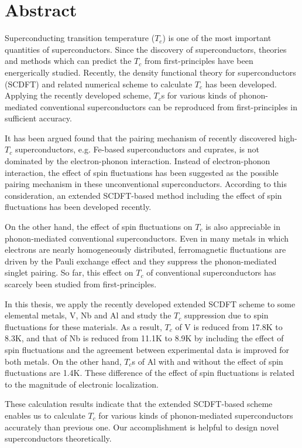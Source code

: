 


\chapter*{Abstract}

Superconducting transition temperature ($T_{c}$) is one of the most important quantities of superconductors. 
Since the discovery of superconductors, theories and methods which can predict the $T_c$ from
first-principles have been energerically studied. Recently, the density functional theory for 
superconductors (SCDFT) and related numerical scheme to calculate $T_c$ has been developed. Applying the recently 
developed scheme, $T_c$s for various kinds of phonon-mediated conventional superconductors can be 
reproduced from first-principles in sufficient accuracy.

It has been argued found that the pairing mechanism of recently discovered high-$T_c$ 
superconductors, e.g. Fe-based superconductors and cuprates, is not dominated by the electron-phonon 
interaction. Instead of electron-phonon interaction, the effect of spin fluctuations has been suggested
as the possible pairing mechanism in these unconventional superconductors. According to this 
consideration, an extended SCDFT-based method including the effect of spin fluctuations has been 
developed recently.

On the other hand, the effect of spin fluctuations on $T_c$ is also appreciable in phonon-mediated conventional
superconductors. Even in many metals in which electrons are nearly homogeneously distributed, ferromagnetic fluctuations
are driven by the Pauli exchange effect and they suppress the phonon-mediated singlet pairing. So far, this effect on 
$T_c$ of conventional superconductors has scarcely been studied from first-principles.

In this thesis, we apply the recently developed extended SCDFT scheme to some elemental metals, V, Nb and Al 
and study the $T_c$ suppression due to spin fluctuations for these materials. As a result,
$T_c$ of V is reduced from 17.8K to 8.3K, and that of Nb is reduced from 11.1K to 8.9K by including
the effect of spin fluctuations and the agreement between experimental data is improved for both 
metals. On the other hand, $T_c$s of Al with and without the effect of spin fluctuations are 1.4K.
These difference of
the effect of spin fluctuations is related to the magnitude of electronic localization.

These calculation results indicate that the extended SCDFT-based scheme enables us to calculate  
$T_c$ for various kinds of phonon-mediated superconductors accurately than previous one. Our 
accomplishment is helpful to design novel superconductors theoretically.




\clearpage


